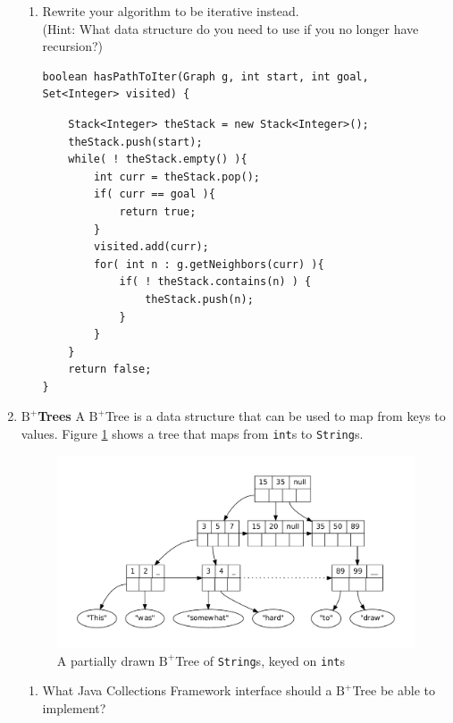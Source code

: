 \documentclass[11pt]{article}
\newenvironment{answer}{\large\lstset{basicstyle=\tiny\ttfamily}\color{white}}{}
\newenvironment{answer}{\large\lstset{basicstyle=\large\ttfamily}\color{red}}{}
\begin{document}
\begin{enumerate}
\begin{enumerate}
		\item
			Rewrite your algorithm to be iterative instead. \\
			(Hint: What data structure do you need to use if you no longer have recursion?)
\begin{verbatim}
boolean hasPathToIter(Graph g, int start, int goal, Set<Integer> visited) {
\end{verbatim}	
			
\begin{answer}
\begin{lstlisting}
	Stack<Integer> theStack = new Stack<Integer>();
	theStack.push(start);
	while( ! theStack.empty() ){
		int curr = theStack.pop();
		if( curr == goal ){
			return true;
		}
		visited.add(curr);
		for( int n : g.getNeighbors(curr) ){
			if( ! theStack.contains(n) ) {
				theStack.push(n);
			}
		}
	}
	return false;
}
\end{lstlisting}
\end{answer}
	\end{enumerate}
            
          


\pagebreak
\item{\bf $\textrm{B}^+$Trees} A $\textrm{B}^+$Tree is a data structure that
can be used to map from keys to values. Figure \ref{b-tree} shows a tree that
maps from {\tt int}s to \texttt{String}s.

\begin{figure}[h]
\caption{A partially drawn $\textrm{B}^+$Tree of \texttt{String}s, keyed on \texttt{int}s}
\label{b-tree}
\center
\includegraphics[width=5in]{b_plus_tree_dot.pdf}
\vspace{-1cm}
\end{figure}

    \begin{enumerate}
    \item What Java Collections Framework interface should a
    $\textrm{B}^+$Tree be able to implement?


\end{enumerate}
\end{enumerate}
\end{document}
